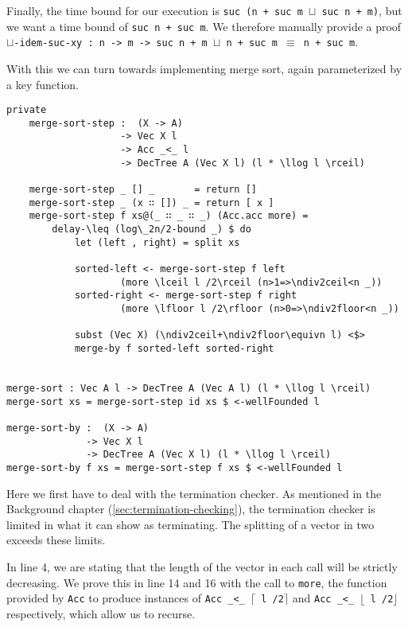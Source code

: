 Finally, the time bound for our execution is \texttt{suc (n + suc m $\sqcup$ suc n + m)}, but we want a time bound of \texttt{suc n + suc m}. We therefore manually provide a proof \texttt{$\sqcup$-idem-suc-xy : n -> m -> suc n + m $\sqcup$ n + suc m $\equiv$ n + suc m}.

With this we can turn towards implementing merge sort, again parameterized by a key function.

\begin{lstlisting}[caption={Mergesort},label={lst:mergesort},emph={DecTree,merge,sort,step,by,recurse,return,delay}]
private
    merge-sort-step :  (X -> A)
                    -> Vec X l
                    -> Acc _<_ l
                    -> DecTree A (Vec X l) (l * \llog l \rceil)

    merge-sort-step _ [] _       = return []
    merge-sort-step _ (x ∷ []) _ = return [ x ]
    merge-sort-step f xs@(_ ∷ _ ∷ _) (Acc.acc more) =
        delay-\leq (log\_2n/2-bound _) $ do
            let (left , right) = split xs

            sorted-left <- merge-sort-step f left
                    (more \lceil l /2\rceil (n>1=>\ndiv2ceil<n _))
            sorted-right <- merge-sort-step f right
                    (more \lfloor l /2\rfloor (n>0=>\ndiv2floor<n _))

            subst (Vec X) (\ndiv2ceil+\ndiv2floor\equivn l) <$>
            merge-by f sorted-left sorted-right


merge-sort : Vec A l -> DecTree A (Vec A l) (l * \llog l \rceil)
merge-sort xs = merge-sort-step id xs $ <-wellFounded l

merge-sort-by :  (X -> A)
              -> Vec X l
              -> DecTree A (Vec X l) (l * \llog l \rceil)
merge-sort-by f xs = merge-sort-step f xs $ <-wellFounded l
\end{lstlisting}

Here we first have to deal with the termination checker. As mentioned in the Background chapter (\autoref{sec:termination-checking}), the termination checker is limited in what it can show as terminating. The splitting of a vector in two exceeds these limits.

In line 4, we are stating that the length of the vector in each call will be strictly decreasing. We prove this in line 14 and 16 with the call to \texttt{more}, the function provided by \texttt{Acc} to produce instances of \texttt{Acc \_<\_ $\lceil$ l /2$\rceil$} and \texttt{Acc \_<\_ $\lfloor$ l /2$\rfloor$} respectively, which allow us to recurse.

